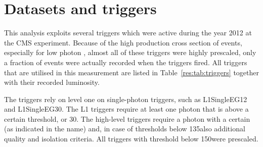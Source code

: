 \section{Datasets and triggers}
\label{res:sec:DatasetsAndTriggers}
This analysis exploits several triggers which were active during the year 2012 at the CMS experiment.
Because of the high production cross section of \GAMJET events, especially for low photon \pt, almost all of these triggers were highly prescaled, \ie only a fraction of events were actually recorded when the triggers fired.
All triggers that are utilised in this measurement are listed in Table~\ref{res:tab:triggers} together with their recorded luminosity.
\renewcommand{\arraystretch}{1.5}
\begin{table}[!b]
\centering
\caption{Single-photon triggers together with the recorded luminosity taking the prescales of the triggers into consideration.}
\label{res:tab:triggers}
\end{table}  
The triggers rely on level one on single-photon triggers, such as L1SingleEG12 and L1SingleEG30.
The L1 triggers require at least one photon that is above a certain \pt threshold, \gev or 30\gev.
The high-level triggers require a photon with a certain \pt (as indicated in the name) and, in case of thresholds below 135\gev also additional quality and isolation criteria. 
All triggers with threshold below 150\gev were prescaled.

